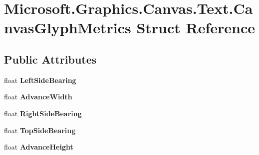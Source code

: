 \hypertarget{struct_microsoft_1_1_graphics_1_1_canvas_1_1_text_1_1_canvas_glyph_metrics}{}\section{Microsoft.\+Graphics.\+Canvas.\+Text.\+Canvas\+Glyph\+Metrics Struct Reference}
\label{struct_microsoft_1_1_graphics_1_1_canvas_1_1_text_1_1_canvas_glyph_metrics}
\subsection*{Public Attributes}
\begin{DoxyCompactItemize}
\item 
\mbox{\label{struct_microsoft_1_1_graphics_1_1_canvas_1_1_text_1_1_canvas_glyph_metrics_ad04fb2d47ee8f82c3d174e9a1c6bc001}} 
float {\bfseries Left\+Side\+Bearing}
\item 
\mbox{\label{struct_microsoft_1_1_graphics_1_1_canvas_1_1_text_1_1_canvas_glyph_metrics_af9c6c19dff2912a368fd69892a302a50}} 
float {\bfseries Advance\+Width}
\item 
\mbox{\label{struct_microsoft_1_1_graphics_1_1_canvas_1_1_text_1_1_canvas_glyph_metrics_ae6a1f86df3464f38520d357337e0ebd7}} 
float {\bfseries Right\+Side\+Bearing}
\item 
\mbox{\label{struct_microsoft_1_1_graphics_1_1_canvas_1_1_text_1_1_canvas_glyph_metrics_a9557a4c9485cfddf3adf27886c1fb0e7}} 
float {\bfseries Top\+Side\+Bearing}
\item 
\mbox{\label{struct_microsoft_1_1_graphics_1_1_canvas_1_1_text_1_1_canvas_glyph_metrics_a2e97822be437aff15ef26897161fcc21}} 
float {\bfseries Advance\+Height}
\item 
\mbox{\label{struct_microsoft_1_1_graphics_1_1_canvas_1_1_text_1_1_canvas_glyph_metrics_aff3133664e9dc4739cd5d2b9746e1713}} 

\end{DoxyCompactItemize}
